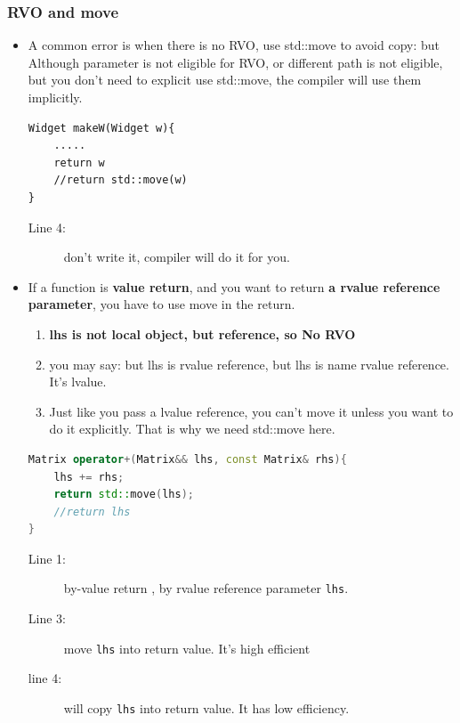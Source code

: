 \documentclass[a4paper,11pt,twoside]{book}
\begin{document}
\subsubsection{RVO and move}
\begin{itemize}
	
	\item A common error is when there is no RVO, use std::move to avoid copy: but Although parameter is not eligible for RVO, or different path is not eligible, but you don't need to explicit use std::move, the compiler will use them implicitly.
	
\begin{lstlisting}
Widget makeW(Widget w){
	.....
	return w
	//return std::move(w) 
} 
\end{lstlisting}
\begin{description}
	\item[Line 4:] don't write it, compiler will do it for you.
\end{description}
	
	\item If a function is \textbf{value return}, and you want to return \textbf{a rvalue reference parameter}, you have to use move in the return.
	\begin{enumerate}
		\item \textbf{lhs is not local object, but reference, so No RVO}
		\item you may say: but lhs is rvalue reference, but lhs is name rvalue reference. It's lvalue.
		
		\item Just like you pass a lvalue reference, you can't move it unless you want to do it explicitly. That is why we need std::move here.
	\end{enumerate}
\begin{lstlisting}[frame=single, language=c++]
Matrix operator+(Matrix&& lhs, const Matrix& rhs){
	lhs += rhs; 
	return std::move(lhs); 
	//return lhs 
} 
\end{lstlisting}
\begin{description}
	\item[Line 1:] by-value return , by rvalue reference parameter \texttt{lhs}.
	\item[Line 3:] move \texttt{lhs} into return value. It's high efficient
	\item[line 4:] will copy \texttt{lhs} into return value. It has low efficiency.
\end{description}

\end{itemize}
\end{document}

